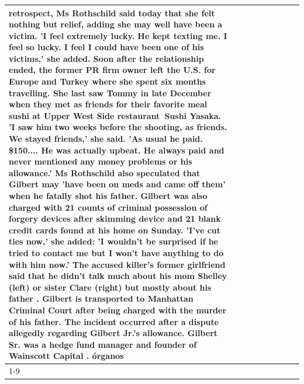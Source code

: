 \begin{table}[H]
\begin{tabular}{lllrlllll}
retrospect, Ms Rothschild said today that she felt nothing but relief, adding she may well have been a victim. 'I feel extremely lucky. He kept texting me. I feel so lucky. I feel I could have been one of his victims,' she added. Soon after the relationship ended, the former PR firm owner left the U.S. for Europe and Turkey where she spent six months  travelling. She last saw Tommy in late December when they met as friends for their favorite meal sushi at Upper West Side restaurant Sushi Yasaka. 'I saw him two weeks before the shooting, as friends. We stayed friends,' she said. 'As usual he paid. \$150.... He was actually upbeat. He always paid and never mentioned any money problems or his allowance.' Ms Rothschild also speculated that Gilbert may 'have been on meds and came off them' when he fatally shot his father. Gilbert was also charged with 21 counts of criminal possession of forgery devices after skimming device and 21 blank credit cards found at his home on Sunday. 'I've cut ties now,' she added: 'I wouldn’t be surprised if he tried to contact me but I won’t have anything to do with him now.' The accused killer's former girlfriend said that he didn't talk much about his mom Shelley (left) or sister Clare (right) but mostly about his father . Gilbert is transported to Manhattan Criminal Court  after being charged with the murder of his father. The incident occurred after a dispute allegedly regarding Gilbert Jr.'s allowance. Gilbert Sr. was a hedge fund manager and founder of Wainscott Capital . órganos \\
\cline{1-9}

\end{tabular}
\end{table}
